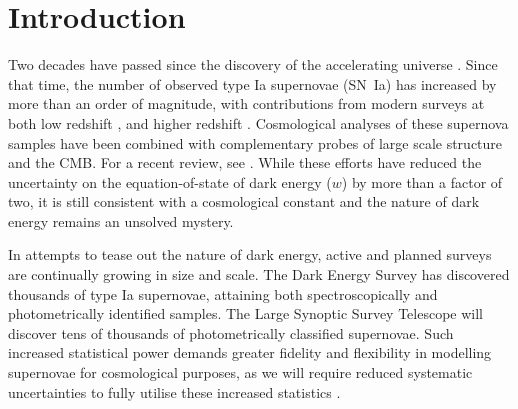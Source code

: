 \documentclass[twocolumn,trackchanges,tighten]{aastex62}
\begin{document}








\section{Introduction}




Two decades have passed since the discovery of the accelerating universe \citep{Riess1998, Perlmutter1999}. Since that time, the number of observed type Ia supernovae (SN~Ia) has increased by more than an order of magnitude, with contributions from modern surveys at both low redshift \citep{Bailey2008, Freedman2009, Hicken2009,  Contreras2010, Conley2011}, and higher redshift \citep{Astier2006, Wood-Vasey2007, Frieman2008, Balland2009, Amanullah2010, chambers2016panstarrs, sako2018sdss}. Cosmological analyses of these supernova samples \citep{Kowalski2008, Kessler2009, Conley2011, Suzuki2012, Betoule2014, Rest2014, Scolnic2017} have been combined with complementary probes of large scale structure and the CMB. For a recent review, see \citet{Huterer2018}. While these efforts have reduced the uncertainty on the equation-of-state of dark energy ($w$) by more than a factor of two, it is still consistent with a cosmological constant and the nature of dark energy remains an unsolved mystery.


In attempts to tease out the nature of dark energy, active and planned surveys are continually growing in size and scale. The Dark Energy Survey \citep[DES,][]{Bernstein2012, Abbott2016} has discovered thousands of type Ia supernovae, attaining both spectroscopically and photometrically identified samples. The Large Synoptic Survey Telescope \citep[LSST,][]{Ivezic2008, LSSTScienceCollaboration2009} will discover tens of thousands of photometrically classified supernovae. Such increased statistical power demands greater fidelity and flexibility in modelling supernovae for cosmological purposes, as we will require reduced systematic uncertainties to fully utilise these increased statistics \citep{Betoule2014, Scolnic2017}.
\end{document}
